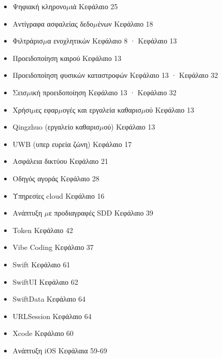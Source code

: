 \begin{itemize}
  \item Ψηφιακή κληρονο$\mu$ιά Κεφάλαιο 25
  \item Αντίγραφα ασφαλείας δεδο$\mu$ένων Κεφάλαιο 18
  \item Φιλτράρισ$\mu$α ενοχλητικών Κεφάλαιο 8 · Κεφάλαιο 13
  \item Προειδοποίηση καιρού Κεφάλαιο 13
  \item Προειδοποίηση φυσικών καταστροφών Κεφάλαιο 13 · Κεφάλαιο 32
  \item Σεισ$\mu$ική προειδοποίηση Κεφάλαιο 13 · Κεφάλαιο 32
  \item Χρήσι$\mu$ες εφαρ$\mu$ογές και εργαλεία καθαρισ$\mu$ού Κεφάλαιο 13
  \item Qingzhuo (εργαλείο καθαρισ$\mu$ού) Κεφάλαιο 13
  \item UWB (υπερ ευρεία ζώνη) Κεφάλαιο 17
  \item Ασφάλεια δικτύου Κεφάλαιο 21
  \item Οδηγός αγοράς Κεφάλαιο 28
  \item Υπηρεσίες cloud Κεφάλαιο 16
  \item Ανάπτυξη $\mu$ε προδιαγραφές SDD Κεφάλαιο 39
  \item Token Κεφάλαιο 42
  \item Vibe Coding Κεφάλαιο 37
  \item Swift Κεφάλαιο 61
  \item SwiftUI Κεφάλαιο 62
  \item SwiftData Κεφάλαιο 64
  \item URLSession Κεφάλαιο 64
  \item Xcode Κεφάλαιο 60
  \item Ανάπτυξη iOS Κεφάλαια 59-69
\end{itemize}


